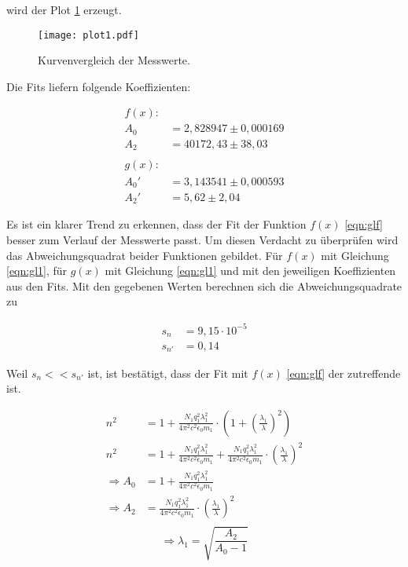 wird der Plot \ref{fig:plot1} erzeugt.

\begin{figure}
  \centering
  \texttt{[image: plot1.pdf]}
  \caption{Kurvenvergleich der Messwerte.}
  \label{fig:plot1}
\end{figure}
\FloatBarrier

Die Fits liefern folgende Koeffizienten:

\begin{align*}
  f(x): \\
  A_0 &= 2,828947 \pm 0,000169 \\
  A_2 &= 40172,43 \pm 38,03 \\
  \\
  g(x): \\
  A_0' &= 3,143541 \pm 0,000593 \\
  A_2' &= 5,62 \pm 2,04 
\end{align*}

Es ist ein klarer Trend zu erkennen, dass der Fit der Funktion $f(x)$ \ref{eqn:glf} besser zum Verlauf der Messwerte passt.
Um diesen Verdacht zu überprüfen wird das Abweichungsquadrat beider Funktionen gebildet.
Für $f(x)$ mit Gleichung \ref{eqn:gl1}, für $g(x)$ mit Gleichung \ref{eqn:gl1} und mit den jeweiligen Koeffizienten aus den Fits.
Mit den gegebenen Werten berechnen sich die Abweichungsquadrate zu

\begin{align*}
  s_{n} &= 9,15 \cdot 10^{-5} \\
  s_{n'} &= 0,14
\end{align*}

Weil $s_n << s_{n'}$ ist, ist bestätigt, dass der Fit mit $f(x)$ \ref{eqn:glf} der zutreffende ist.

\begin{align*}
  n^2 &= 1 + \frac{N_1 q_1^2 \lambda_1^2}{4 \pi^2 c^2 \epsilon_0 m_1}\cdot\left(1+\left(\frac{\lambda_1}{\lambda}\right)^2\right) \\
  n^2 &= 1 + \frac{N_1 q_1^2 \lambda_1^2}{4 \pi^2 c^2 \epsilon_0 m_1} + \frac{N_1 q_1^2 \lambda_1^2}{4 \pi^2 c^2 \epsilon_0 m_1} \cdot \left(\frac{\lambda_1}{\lambda}\right)^2 \\
  \Rightarrow A_0 &= 1 + \frac{N_1 q_1^2 \lambda_1^2}{4 \pi^2 c^2 \epsilon_0 m_1} \\
  \Rightarrow A_2 &= \frac{N_1 q_1^2 \lambda_1^2}{4 \pi^2 c^2 \epsilon_0 m_1} \cdot \left(\frac{\lambda_1}{\lambda}\right)^2 \\
\end{align*}
\begin{equation}
  \Rightarrow \lambda_1 = \sqrt{\frac{A_2}{A_0-1}}
  \label{eqn:ausw1}
\end{equation}